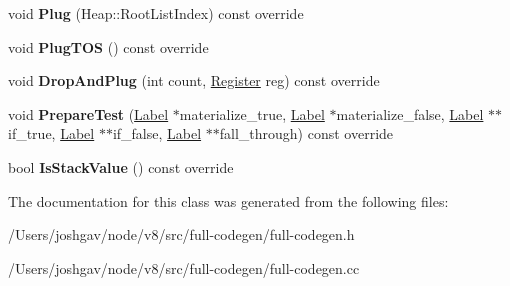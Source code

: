 \begin{DoxyCompactItemize}
\item 
void {\bfseries Plug} (Heap\+::\+Root\+List\+Index) const  override\hypertarget{classv8_1_1internal_1_1_full_code_generator_1_1_stack_value_context_a0f41fe1f393c0436b48abf70b91292ec}{}\label{classv8_1_1internal_1_1_full_code_generator_1_1_stack_value_context_a0f41fe1f393c0436b48abf70b91292ec}

\item 
void {\bfseries Plug\+T\+OS} () const  override\hypertarget{classv8_1_1internal_1_1_full_code_generator_1_1_stack_value_context_a1427f07a86d82215039566184d88cf49}{}\label{classv8_1_1internal_1_1_full_code_generator_1_1_stack_value_context_a1427f07a86d82215039566184d88cf49}

\item 
void {\bfseries Drop\+And\+Plug} (int count, \hyperlink{structv8_1_1internal_1_1_register}{Register} reg) const  override\hypertarget{classv8_1_1internal_1_1_full_code_generator_1_1_stack_value_context_aba951849853fd2c5073a36d00c7fa4bf}{}\label{classv8_1_1internal_1_1_full_code_generator_1_1_stack_value_context_aba951849853fd2c5073a36d00c7fa4bf}

\item 
void {\bfseries Prepare\+Test} (\hyperlink{classv8_1_1internal_1_1_label}{Label} $\ast$materialize\+\_\+true, \hyperlink{classv8_1_1internal_1_1_label}{Label} $\ast$materialize\+\_\+false, \hyperlink{classv8_1_1internal_1_1_label}{Label} $\ast$$\ast$if\+\_\+true, \hyperlink{classv8_1_1internal_1_1_label}{Label} $\ast$$\ast$if\+\_\+false, \hyperlink{classv8_1_1internal_1_1_label}{Label} $\ast$$\ast$fall\+\_\+through) const  override\hypertarget{classv8_1_1internal_1_1_full_code_generator_1_1_stack_value_context_acbfd7ad247f197a09a089c54ea1eb29b}{}\label{classv8_1_1internal_1_1_full_code_generator_1_1_stack_value_context_acbfd7ad247f197a09a089c54ea1eb29b}

\item 
bool {\bfseries Is\+Stack\+Value} () const  override\hypertarget{classv8_1_1internal_1_1_full_code_generator_1_1_stack_value_context_a1da459ac9e41f8dca7261abfdf4b0508}{}\label{classv8_1_1internal_1_1_full_code_generator_1_1_stack_value_context_a1da459ac9e41f8dca7261abfdf4b0508}

\end{DoxyCompactItemize}


The documentation for this class was generated from the following files\+:\begin{DoxyCompactItemize}
\item 
/\+Users/joshgav/node/v8/src/full-\/codegen/full-\/codegen.\+h\item 
/\+Users/joshgav/node/v8/src/full-\/codegen/full-\/codegen.\+cc\end{DoxyCompactItemize}
